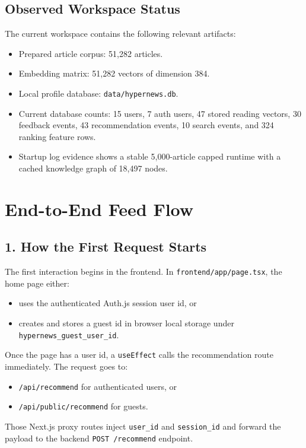 \documentclass[12pt]{article}
\begin{document}
\subsection{Observed Workspace Status}
The current workspace contains the following relevant artifacts:
\begin{itemize}[leftmargin=1.5em]
  \item Prepared article corpus: 51,282 articles.
  \item Embedding matrix: 51,282 vectors of dimension 384.
  \item Local profile database: \texttt{data/hypernews.db}.
  \item Current database counts: 15 users, 7 auth users, 47 stored reading vectors, 30 feedback events, 43 recommendation events, 10 search events, and 324 ranking feature rows.
  \item Startup log evidence shows a stable 5,000-article capped runtime with a cached knowledge graph of 18,497 nodes.
\end{itemize}

\section{End-to-End Feed Flow}
\subsection{1. How the First Request Starts}
The first interaction begins in the frontend. In \texttt{frontend/app/page.tsx}, the home page either:
\begin{itemize}[leftmargin=1.5em]
  \item uses the authenticated Auth.js session user id, or
  \item creates and stores a guest id in browser local storage under \texttt{hypernews\_guest\_user\_id}.
\end{itemize}

Once the page has a user id, a \texttt{useEffect} calls the recommendation route immediately. The request goes to:
\begin{itemize}[leftmargin=1.5em]
  \item \texttt{/api/recommend} for authenticated users, or
  \item \texttt{/api/public/recommend} for guests.
\end{itemize}

Those Next.js proxy routes inject \texttt{user\_id} and \texttt{session\_id} and forward the payload to the backend \texttt{POST /recommend} endpoint.
\end{document}
